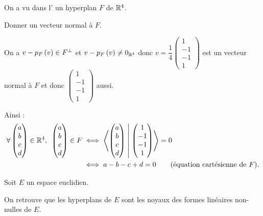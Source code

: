 \begin{exoex}
On a vu dans l' un hyperplan \(F\) de \(\mathbb{R}^4\).

Donner un vecteur normal à \(F\).
\end{exoex}

\begin{corr}
On a \(v-p_F\left(v\right)\in F^{\perp}\) et \(v-p_F\left(v\right)\not=0_{\mathbb{R}^4}\) donc \(v=\dfrac{1}{4}\begin{pmatrix}
1 \\ -1 \\ -1 \\ 1
\end{pmatrix}\) est un vecteur normal à \(F\) et donc \(\begin{pmatrix}
1 \\ -1 \\ -1 \\ 1
\end{pmatrix}\) aussi.

Ainsi : \[\begin{aligned}
\quantifs{\forall\begin{pmatrix}a \\ b \\ c \\ d\end{pmatrix}\in\R^4}\begin{pmatrix}a \\ b \\ c \\ d\end{pmatrix}\in F&\ssi\ps{\begin{pmatrix}a \\ b \\ c \\ d\end{pmatrix}}{\begin{pmatrix}
1 \\ -1 \\ -1 \\ 1
\end{pmatrix}}=0 \\
&\ssi a-b-c+d=0\qquad\text{(équation cartésienne de \(F\)).}
\end{aligned}\]
\end{corr}

\begin{rem}
Soit \(E\) un espace euclidien.

On retrouve que les hyperplans de \(E\) sont les noyaux des formes linéaires non-nulles de \(E\).
\end{rem}

